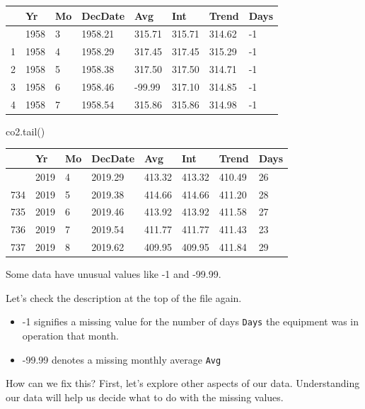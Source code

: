\documentclass[
  letterpaper,
  DIV=11,
  numbers=noendperiod]{scrreprt}
\newenvironment{Shaded}{\begin{snugshade}}{\end{snugshade}}
\newcommand{\NormalTok}[1]{\textcolor[rgb]{0.00,0.23,0.31}{#1}}
\providecommand{\tightlist}{%
  \setlength{\itemsep}{0pt}\setlength{\parskip}{0pt}}\usepackage{longtable,booktabs,array}
\begin{document}
\begin{longtable}[]{@{}llllllll@{}}
\toprule\noalign{}
& Yr & Mo & DecDate & Avg & Int & Trend & Days \\
\midrule\noalign{}
\endhead
\bottomrule\noalign{}
\endlastfoot
0 & 1958 & 3 & 1958.21 & 315.71 & 315.71 & 314.62 & -1 \\
1 & 1958 & 4 & 1958.29 & 317.45 & 317.45 & 315.29 & -1 \\
2 & 1958 & 5 & 1958.38 & 317.50 & 317.50 & 314.71 & -1 \\
3 & 1958 & 6 & 1958.46 & -99.99 & 317.10 & 314.85 & -1 \\
4 & 1958 & 7 & 1958.54 & 315.86 & 315.86 & 314.98 & -1 \\
\end{longtable}

\begin{Shaded}
\begin{Highlighting}[]
\NormalTok{co2.tail()}
\end{Highlighting}
\end{Shaded}

\begin{longtable}[]{@{}llllllll@{}}
\toprule\noalign{}
& Yr & Mo & DecDate & Avg & Int & Trend & Days \\
\midrule\noalign{}
\endhead
\bottomrule\noalign{}
\endlastfoot
733 & 2019 & 4 & 2019.29 & 413.32 & 413.32 & 410.49 & 26 \\
734 & 2019 & 5 & 2019.38 & 414.66 & 414.66 & 411.20 & 28 \\
735 & 2019 & 6 & 2019.46 & 413.92 & 413.92 & 411.58 & 27 \\
736 & 2019 & 7 & 2019.54 & 411.77 & 411.77 & 411.43 & 23 \\
737 & 2019 & 8 & 2019.62 & 409.95 & 409.95 & 411.84 & 29 \\
\end{longtable}

Some data have unusual values like -1 and -99.99.

Let's check the description at the top of the file again.

\begin{itemize}
\tightlist
\item
  -1 signifies a missing value for the number of days \texttt{Days} the
  equipment was in operation that month.
\item
  -99.99 denotes a missing monthly average \texttt{Avg}
\end{itemize}

How can we fix this? First, let's explore other aspects of our data.
Understanding our data will help us decide what to do with the missing
values.
\end{document}
